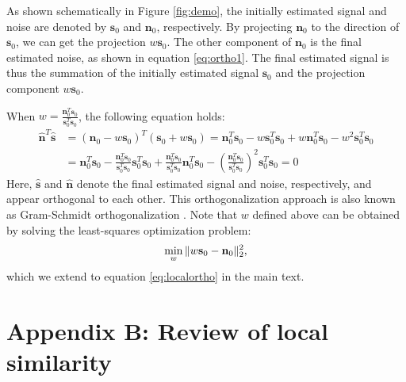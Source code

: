 
As shown schematically in Figure \ref{fig:demo}, the initially estimated signal and noise are denoted by $\mathbf{s}_0$ and $\mathbf{n}_0$, respectively. By projecting $\mathbf{n}_0$ to the direction of $\mathbf{s}_0$, we can get the projection $w\mathbf{s}_0$. The other component of $\mathbf{n}_0$ is the final estimated noise, as shown in equation \ref{eq:ortho1}. The final estimated signal is thus the summation of the initially estimated signal $\mathbf{s}_0$ and the projection component $w\mathbf{s}_0$. 

When $w=\frac{\mathbf{n}_0^T\mathbf{s}_0}{\mathbf{s}_0^T\mathbf{s}_0}$, the following equation holds:
\begin{equation}
\label{eq:append-ortho}
\begin{split}
\hat{\mathbf{n}}^T\hat{\mathbf{s}} &=(\mathbf{n}_0-w\mathbf{s}_0)^T(\mathbf{s}_0+w\mathbf{s}_0) =\mathbf{n}_0^T\mathbf{s}_0-w\mathbf{s}_0^T\mathbf{s}_0+w\mathbf{n}_0^T\mathbf{s}_0-w^2\mathbf{s}_0^T\mathbf{s}_0\\
								   &=\mathbf{n}_0^T\mathbf{s}_0-\frac{\mathbf{n}_0^T\mathbf{s}_0}{\mathbf{s}_0^T\mathbf{s}_0}\mathbf{s}_0^T\mathbf{s}_0+\frac{\mathbf{n}_0^T\mathbf{s}_0}{\mathbf{s}_0^T\mathbf{s}_0}\mathbf{n}_0^T\mathbf{s}_0-\left(\frac{\mathbf{n}_0^T\mathbf{s}_0}{\mathbf{s}_0^T\mathbf{s}_0}\right)^2\mathbf{s}_0^T\mathbf{s}_0 =0
\end{split}
\end{equation}
Here, $\hat{\mathbf{s}}$ and $\hat{\mathbf{n}}$ denote the final estimated signal and noise, respectively, and appear orthogonal to each other. This orthogonalization approach is also known as Gram-Schmidt orthogonalization \cite[]{gram}. Note that $w$ defined above can be obtained by solving the least-squares optimization problem: 
\begin{equation}
\label{eq:a2}
\min_{w} \Arrowvert w\mathbf{s}_0-\mathbf{n}_0\Arrowvert^2_2,
\end{equation}
which we extend to equation \ref{eq:localortho} in the main text.

\appendix
\section{Appendix B: Review of local similarity}

